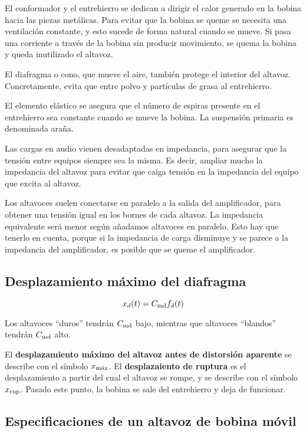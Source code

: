 \documentclass[10pt]{book}
\begin{document}
El conformador y el entrehierro se dedican a dirigir el calor generado en la bobina hacia las piezas metálicas. Para evitar que la bobina se queme se necesita una ventilación constante, y esto sucede de forma natural cuando se mueve. Si pasa una corriente a través de la bobina sin producir movimiento, se quema la bobina y queda inutilizado el altavoz.

El diafragma o cono, que mueve el aire, también protege el interior del altavoz. Concretamente, evita que entre polvo y partículas de grasa al entrehierro.

El elemento elástico se asegura que el número de espiras presente en el entrehierro sea constante cuando se mueve la bobina. La suspensión primaria es denominada araña.

Las cargas en audio vienen desadaptadas en impedancia, para asegurar que la tensión entre equipos siempre sea la misma. Es decir, ampliar mucho la impedancia del altavoz para evitar que caiga tensión en la impedancia del equipo que excita al altavoz.

Los altavoces suelen conectarse en paralelo a la salida del amplificador, para obtener una tensión igual en los bornes de cada altavoz. La impedancia equivalente será menor según añadamos altavoces en paralelo. Esto hay que tenerlo en cuenta, porque si la impedancia de carga disminuye y se parece a la impedancia del amplificador, es posible que se queme el amplificador.

\subsection{Desplazamiento máximo del diafragma}
\[ x_d (t) = C _{\textnormal{md}} f_d (t) \]

Los altavoces ``duros'' tendrán $C _{\textnormal{md}}$ bajo, mientras que altavoces ``blandos'' tendrán $C _{\textnormal{md}}$ alto.

El \textbf{desplazamiento máximo del altavoz antes de distorsión aparente} se describe con el símbolo $x _{\textnormal{máx}}$. El \textbf{desplazaiento de ruptura} es el desplazamiento a partir del cual el altavoz se rompe, y se describe con el símbolo $x _{\textnormal{rup}}$. Pasado este punto, la bobina se sale del entrehierro y deja de funcionar.

\subsection{Especificaciones de un altavoz de bobina móvil}
\end{document}
